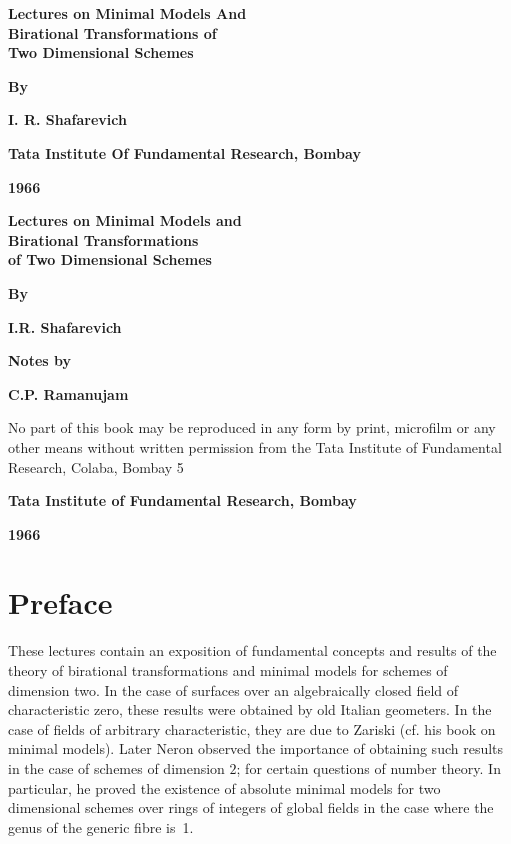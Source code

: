 \thispagestyle{empty}
\begin{center}
{\Large\bf Lectures on Minimal Models And}\\[5pt]
{\Large\bf Birational Transformations of}\\[5pt]
{\Large\bf Two Dimensional Schemes}
\vskip 1cm


{\bf By}
\medskip


{\large\bf I. R. Shafarevich}
\vfill

{\bf Tata Institute Of Fundamental Research, Bombay}


{\bf 1966}
\end{center}
\eject


\thispagestyle{empty}
\begin{center}
{\Large\bf Lectures on Minimal Models and}\\[5pt] 
{\Large\bf Birational Transformations}\\[5pt]
{\Large\bf of Two Dimensional Schemes}
\vskip 1cm


{\bf By}
\medskip

{\large\bf I.R. Shafarevich}
\vfill

{\bf Notes by}\\
\medskip

{\large\bf C.P. Ramanujam}
\vfill

\parbox{0.7\textwidth}{No part of this book may be reproduced
in any form by print, microfilm or any
other means without written permission
from the Tata Institute of Fundamental
Research, Colaba, Bombay 5}
\vfill


{\bf Tata Institute of Fundamental Research, Bombay}
\medskip

{\bf 1966}
\end{center}
\eject


\chapter{Preface}


These lectures contain an exposition of fundamental concepts and
results of the theory of birational transformations and minimal models
for schemes of dimension two. In the case of surfaces over an
algebraically closed field of characteristic zero, these results were
obtained by old Italian geometers. In the case of fields of arbitrary
characteristic, they are due to Zariski (cf. his book on minimal
models). Later Neron observed the importance of obtaining such results
in the case of schemes of dimension $2$; for certain questions of
number theory. In particular, he proved the existence of absolute
minimal models for two dimensional schemes over rings of integers of
global fields in the case where the genus of the generic fibre is~1. 

